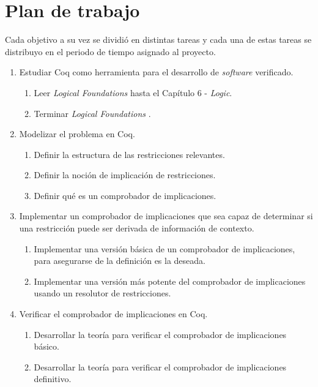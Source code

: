 \section{Plan de trabajo}

Cada objetivo a su vez se dividió en distintas tareas y cada una de estas tareas se distribuyo
en el periodo de tiempo asignado al proyecto.

\begin{enumerate}
    \item Estudiar Coq como herramienta para el desarrollo de \emph{software} verificado. \\
    \begin{enumerate}[label={1.{\arabic*}.}]
        \item\label{tarea:1.1} Leer \emph{Logical Foundations} \cite{Pierce2017Logical} hasta el
              Capítulo 6 - \emph{Logic}.
        \item\label{tarea:1.2} Terminar \emph{Logical Foundations} \cite{Pierce2017Logical}.
    \end{enumerate}

    \item Modelizar el problema en Coq.
    \begin{enumerate}[label={2.{\arabic*}.}]
        \item\label{tarea:2.1} Definir la estructura de las restricciones relevantes.
        \item\label{tarea:2.2} Definir la noción de implicación de restricciones.
        \item\label{tarea:2.3} Definir qué es un comprobador de implicaciones.
    \end{enumerate}

    \item Implementar un comprobador de implicaciones que sea capaz de determinar si una
          restricción puede ser derivada de información de contexto.
    \begin{enumerate}[label={3.{\arabic*}.}]
        \item\label{tarea:3.1} Implementar una versión básica de un comprobador de implicaciones,
             para asegurarse de la definición es la deseada.
        \item\label{tarea:3.2} Implementar una versión más potente del comprobador de implicaciones
             usando un resolutor de restricciones.
    \end{enumerate}

    \item Verificar el comprobador de implicaciones en Coq.
    \begin{enumerate}[label={4.{\arabic*}.}]
        \item\label{tarea:4.1} Desarrollar la teoría para verificar el comprobador de implicaciones básico.
        \item\label{tarea:4.2} Desarrollar la teoría para verificar el comprobador de implicaciones definitivo.
    \end{enumerate}
\end{enumerate}

